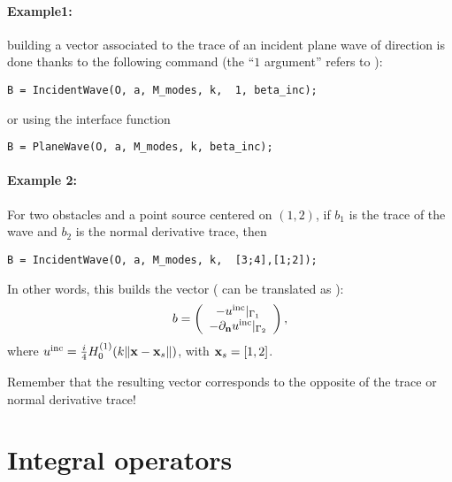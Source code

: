 \paragraph{Example1:} building a vector associated to the trace of an incident plane wave of direction  is done thanks to the following command (the ``$1$ argument'' refers to ):
\begin{verbatim}
B = IncidentWave(O, a, M_modes, k,  1, beta_inc);
\end{verbatim}
or using the interface function
\begin{verbatim}
B = PlaneWave(O, a, M_modes, k, beta_inc);
\end{verbatim}
\paragraph{Example 2:} For two obstacles and a point source centered on $(1,2)$, if $b_1$ is the trace of the wave and $b_2$ is the normal derivative trace, then
\begin{verbatim}
B = IncidentWave(O, a, M_modes, k,  [3;4],[1;2]);
\end{verbatim}
In other words, this builds the vector (\code{[3,4]} can be translated as ):
$$
b = \left(\begin{array}{c}
-u^{\textrm{inc}}|_{\Gamma_1}\\
-\partial_{\mathbf{n}}u^{\textrm{inc}}|_{\Gamma_2}\\
\end{array}\right),
$$
where $u^{\textrm{inc}} = \frac{i}{4}H_0^{(1)}(k\|{\mathbf{x}}-{\mathbf{x}}_s\|)$, with ${\mathbf{x}}_s = [1,2]$.
\begin{remark}
Remember that the resulting vector corresponds to the opposite of the trace or normal derivative trace!
\end{remark}


\section{Integral operators}

